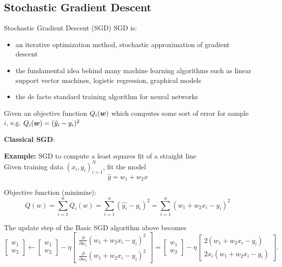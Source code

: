 \subsection{Stochastic Gradient Descent}

\begin{frame}{Stochastic Gradient Descent (SGD)}
    SGD is:
    \begin{itemize}
        \item an iterative optimization method, stochastic approximation of gradient descent
        \item the fundamental idea behind many machine learning algorithms such as linear
              support vector machines, logistic regression, graphical models
        \item the de facto standard training algorithm for neural networks
    \end{itemize}

    Given an objective function $Q_i(\bm{w})$ which computes some sort of error for sample $i$,
    e.g. $Q_i(\bm{w}) = (\hat y_i - y_i)^2$

    \begin{boxed}
        \textbf{Classical SGD}:
        
    \end{boxed}
\end{frame}

\begin{frame}
    \textbf{Example:} SGD to compute a least squares fit of a straight line\\
    Given training data ${(x_i, y_i)}_{i=1}^N$, fit the model
    $$\hat{y} = \! w_1 + w_2 x$$

    Objective function (minimize):
    $$Q(w) = \sum_{i=1}^n Q_i(w) = \sum_{i=1}^n \left(\hat{y_i}-y_i\right)^2 = \sum_{i=1}^n \left(w_1 + w_2 x_i - y_i\right)^2$$

    The update step of the Basic SGD algorithm above becomes
    $$\begin{bmatrix} w_1 \\ w_2 \end{bmatrix} \leftarrow
        \begin{bmatrix} w_1 \\ w_2 \end{bmatrix}
        - \eta \begin{bmatrix} \frac{\partial}{\partial w_1} (w_1 + w_2 x_i - y_i)^2 \\
            \frac{\partial}{\partial w_2} (w_1 + w_2 x_i - y_i)^2\end{bmatrix} =
        \begin{bmatrix} w_1 \\ w_2 \end{bmatrix}
        -  \eta  \begin{bmatrix} 2 (w_1 + w_2 x_i - y_i) \\ 2 x_i(w_1 + w_2 x_i - y_i) \end{bmatrix}.
    $$
\end{frame}

